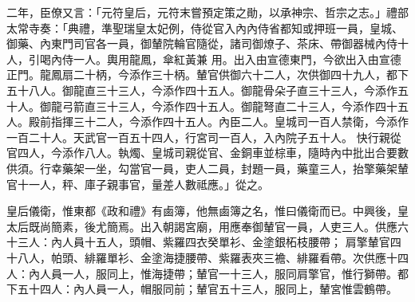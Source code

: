 \begin{pinyinscope}
 二年，臣僚又言：「元符皇后，元符末嘗預定策之勛，以承神宗、哲宗之志。」禮部太常寺奏：「典禮，準聖瑞皇太妃例，侍從官入內內侍省都知或押班一員，皇城、御藥、內東門司官各一員，御輦院輪官隨從，諸司御燎子、茶床、帶御器械內侍十人，引喝內侍一人。輿用龍鳳，傘紅黃兼
 用。出入由宣德東門，今欲出入由宣德正門。龍鳳扇二十柄，今添作三十柄。輦官供御六十二人，次供御四十九人，都下五十八人。御龍直三十三人，今添作四十五人。御龍骨朵子直三十三人，今添作五十人。御龍弓箭直三十三人，今添作四十五人。御龍弩直二十三人，今添作四十五人。殿前指揮三十二人，今添作四十五人。內臣二人。皇城司一百人禁衛，今添作一百二十人。天武官一百五十四人，行宮司一百人，入內院子五十人。
 快行親從官四人，今添作八人。執燭、皇城司親從官、金銅車並棕車，隨時內中批出合要數供須。行幸藥架一坐，勾當官一員，吏人二員，封題一員，藥童三人，抬擎藥架輦官十一人，秤、庫子親事官，量差人數祗應。」從之。



 皇后儀衛，惟東都《政和禮》有鹵簿，他無鹵簿之名，惟曰儀衛而已。中興後，皇太后既尚簡素，後尤簡焉。出入朝謁宮廟，用應奉御輦官一員，人吏三人。供應六十三人：內人員十五人，頭帽、紫羅四衣癸單衫、金塗銀柘枝腰帶；
 肩擎輦官四十八人，帕頭、緋羅單衫、金塗海捷腰帶、紫羅表夾三襜、緋羅看帶。次供應十四人：內人員一人，服同上，惟海捷帶；輦官一十三人，服同肩擎官，惟行獅帶。都下五十四人：內人員一人，帽服同前；輦官五十三人，服同上，輦宮惟雲鶴帶。



\end{pinyinscope}